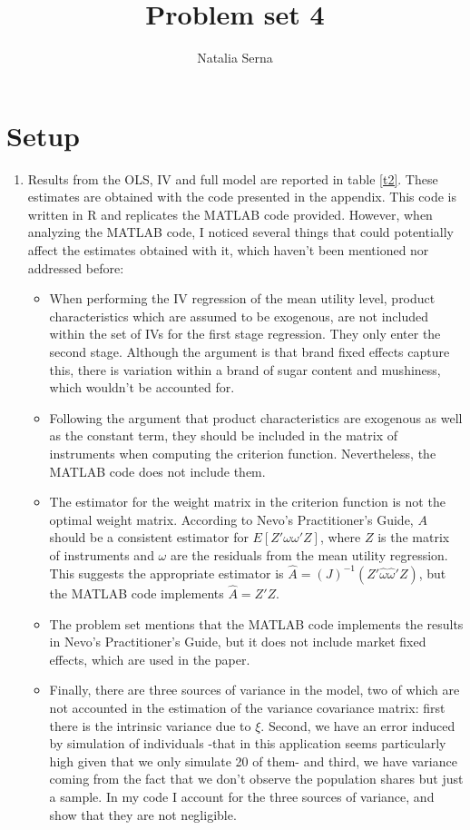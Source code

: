 \documentclass[12pt,english]{article}
\author{
Natalia Serna
   }
\title{Problem set 4}
\date{}
\begin{document}
\maketitle


\section{Setup}
\begin{enumerate}
\item  Results from the OLS, IV and full model are reported in table \eqref{t2}. These estimates are obtained with the code presented in the appendix. This code is written in R and replicates the MATLAB code provided. However, when analyzing the MATLAB code, I noticed several things that could potentially affect the estimates obtained with it, which haven't been mentioned nor addressed before:
\begin{itemize}
\item When performing the IV regression of the mean utility level, product characteristics which are assumed to be exogenous, are not included within the set of IVs for the first stage regression. They only enter the second stage. Although the argument is that brand fixed effects capture this, there is variation within a brand of sugar content and mushiness, which wouldn't be accounted for.
\item Following the argument that product characteristics are exogenous as well as the constant term, they should be included in the matrix of instruments when computing the criterion function. Nevertheless, the MATLAB code does not include them.
\item The estimator for the weight matrix in the criterion function is not the optimal weight matrix. According to Nevo's Practitioner's Guide, $A$ should be a consistent estimator for $E[Z'\omega\omega'Z]$, where $Z$ is the matrix of instruments and $\omega$ are the residuals from the mean utility regression. This suggests the appropriate estimator is $\hat{A}=(J)^{-1}(Z'\hat{\omega}\hat{\omega}'Z)$, but the MATLAB code implements $\hat{A}=Z'Z$.
\item The problem set  mentions that the MATLAB code implements the results in Nevo's Practitioner's Guide, but it does not include market fixed effects, which are used in the paper.
\item Finally, there are three sources of variance in the model, two of which are not accounted in the estimation of the variance covariance matrix: first there is the intrinsic variance due to $\xi$. Second, we have an error induced by simulation of individuals -that in this application seems particularly high given that we only simulate 20 of them- and third, we have variance coming from the fact that we don't observe the population shares but just a sample. In my code I account for the three sources of variance, and show that they are not negligible.
\end{itemize}



\end{enumerate}
\end{document}
